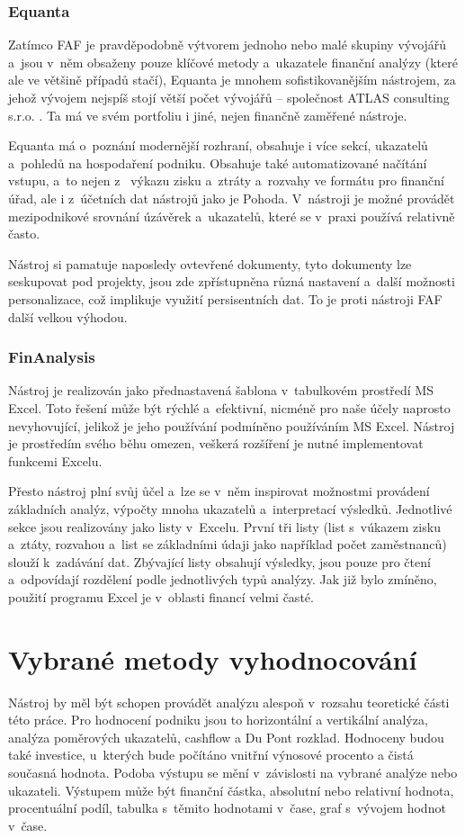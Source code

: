 \subsubsection{Equanta}
Zatímco FAF je pravděpodobně výtvorem jednoho nebo malé skupiny vývojářů a~jsou v~něm obsaženy pouze klíčové metody a~ukazatele finanční analýzy (které ale ve většině případů stačí), Equanta je mnohem sofistikovanějším nástrojem, za jehož vývojem nejspíš stojí větší počet vývojářů -- společnost ATLAS consulting s.r.o. . Ta má ve svém portfoliu i jiné, nejen finančně zaměřené nástroje.

Equanta má o~poznání modernější rozhraní, obsahuje i více sekcí, ukazatelů a~pohledů na hospodaření podniku. Obsahuje také automatizované načítání vstupu, a~to nejen z~ výkazu zisku a~ztráty a~rozvahy ve formátu pro finanční úřad, ale i z~účetních dat nástrojů jako je Pohoda. V~nástroji je možné provádět mezipodnikové srovnání úzávěrek a~ukazatelů, které se v~praxi používá relativně často.

Nástroj si pamatuje naposledy ovtevřené dokumenty, tyto dokumenty lze seskupovat pod projekty, jsou zde zpřístupněna různá nastavení a~další možnosti personalizace, což implikuje využití persisentních dat. To je proti nástroji FAF další velkou výhodou. 


\subsubsection{FinAnalysis}
Nástroj je realizován jako přednastavená šablona v~tabulkovém prostředí MS Excel. Toto řešení může být rýchlé a~efektivní, nicméně pro naše účely naprosto nevyhovující, jelikož je jeho používání podmíněno používáním MS Excel. Nástroj je prostředím svého běhu omezen, veškerá rozšíření je nutné implementovat funkcemi Excelu.

Přesto nástroj plní svůj ůčel a~lze se v~něm inspirovat možnostmi provádení základních analýz, výpočty mnoha ukazatelů a~interpretací výsledků. Jednotlivé sekce jsou realizovány jako listy v~Excelu. První tři listy (list s~vúkazem zisku a~ztáty, rozvahou a~list se základními údaji jako například počet zaměstnanců) slouží k~zadávání dat. Zbývající listy obsahují výsledky, jsou pouze pro čtení a~odpovídají rozdělení podle jednotlivých typů analýzy. Jak již bylo zmíněno, použití programu Excel je v~oblasti financí velmi časté.



\section{Vybrané metody vyhodnocování}
Nástroj by měl být schopen provádět analýzu alespoň v~rozsahu teoretické části této práce. Pro hodnocení podniku jsou to horizontální a vertikální analýza, analýza poměrových ukazatelů, cashflow a Du Pont rozklad. Hodnoceny budou také investice, u~kterých bude počítáno vnitřní výnosové procento a čistá současná hodnota. Podoba výstupu se mění v~závislosti na vybrané analýze nebo ukazateli. Výstupem může být finanční částka, absolutní nebo relativní hodnota, procentuální podíl, tabulka s~těmito hodnotami v~čase, graf s~vývojem hodnot v~čase.

